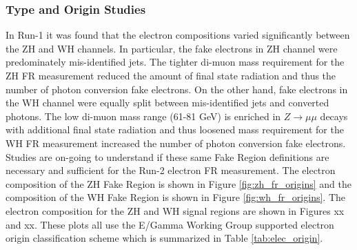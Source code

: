 \subsubsection{Type and Origin Studies}
In Run-1 it was found that the electron compositions varied significantly between the ZH and WH channels. In particular, the fake electrons in ZH channel were predominately mis-identified jets. The tighter di-muon mass requirement for the ZH FR measurement reduced the amount of final state radiation and thus the number of photon conversion fake electrons. On the other hand, fake electrons in the WH channel were equally split between mis-identified jets and converted photons. The low di-muon mass range (61-81 GeV) is enriched in $Z\rightarrow\mu\mu$ decays with additional final state radiation and thus loosened mass requirement for the WH FR measurement increased the number of photon conversion fake electrons.\\

Studies are on-going to understand if these same Fake Region definitions are necessary and sufficient for the Run-2 electron FR measurement. The electron composition of the ZH Fake Region is shown in Figure \ref{fig:zh_fr_origins} and the composition of the WH Fake Region is shown in Figure \ref{fig:wh_fr_origins}. The electron composition for the ZH and WH signal regions are shown in Figures xx and xx. These plots all use the E/Gamma Working Group supported electron origin classification scheme which is summarized in Table \ref{tab:elec_origin}.\\

